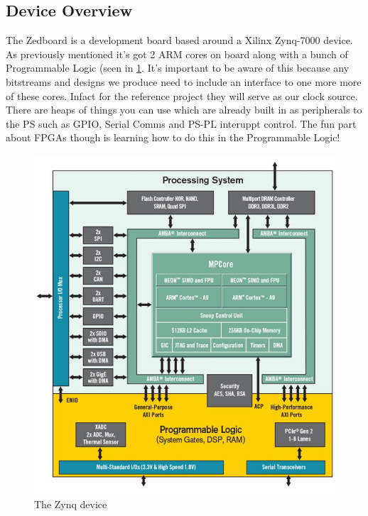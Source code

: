 \documentclass[11pt,a4paper]{article}
\begin{document}
\subsection{Device Overview}
The Zedboard is a development board based around a Xilinx Zynq-7000 device. As previously mentioned it's got 2 ARM cores on board along with a bunch of Programmable Logic (seen in \cref{fig:zynq}. It's important to be aware of this because any bitstreams and designs we produce need to include an interface to one more more of these cores. Infact for the reference project they will serve as our clock source. There are heaps of things you can use which are already built in as peripherals to the PS such as GPIO, Serial Comms and PS-PL interuppt control. The fun part about FPGAs though is learning how to do this in the Programmable Logic!

\begin{figure}
    \begin{center}
        \includegraphics[width=\textwidth]{./src/zynq_arch.jpg}
        \caption{The Zynq device}
        \label{fig:zynq}
    \end{center}
\end{figure}
\end{document}
